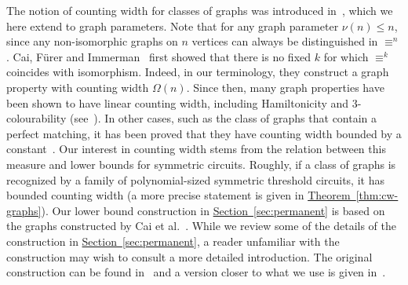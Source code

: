 \documentclass[11pt]{article}
\newcommand{\expref}[2]{\texorpdfstring{\hyperref[#2]{#1~\ref{#2}}}{#1~\ref{#2}}}
\begin{document}
The notion of counting width for classes of
graphs was introduced in~\cite{DawarW17}, which we here extend to graph
parameters. Note that for any graph parameter $\nu(n) \leq n$, since
any non-isomorphic graphs on $n$ vertices can %
always  %
be distinguished in $\equiv^n$.
Cai, F\"{u}rer and Immerman~\cite{CFI92} first showed that there is no fixed $k$
for which $\equiv^k$ coincides with isomorphism. Indeed, in our terminology,
they construct a graph property with counting width $\Omega(n)$. Since then,
many graph properties have been shown to have linear counting width, including
Hamiltonicity and 3-colourability
(see~\cite{AtseriasDO19}). In other cases, such as the class of graphs that
contain a perfect matching, it has been proved that they have counting width
bounded by a constant~\cite{AndersonDH15}. Our interest in counting width stems
from the relation between this measure and lower bounds for symmetric circuits.
Roughly, if a class of graphs is recognized by a family of
polynomial-sized symmetric threshold circuits, it has bounded counting width (a
more precise statement is given in
\expref{Theorem}{thm:cw-graphs}).
Our lower bound construction in \expref{Section}{sec:permanent} is based on the
graphs constructed by Cai et al.~\cite{CFI92}. While we review some of the
details of the construction in \expref{Section}{sec:permanent}, a reader unfamiliar
with the construction may wish to consult a more detailed introduction. The
original construction can be found in~\cite{CFI92} and a version closer to what
we use is given in~\cite{DR07}.
\end{document}
